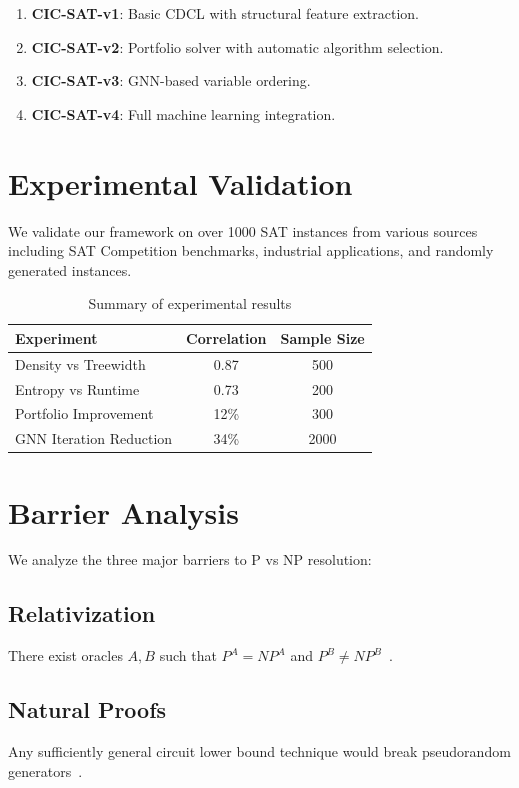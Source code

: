 \documentclass[11pt,a4paper]{article}
\begin{document}
\begin{enumerate}
\item \textbf{CIC-SAT-v1}: Basic CDCL with structural feature extraction.
\item \textbf{CIC-SAT-v2}: Portfolio solver with automatic algorithm selection.
\item \textbf{CIC-SAT-v3}: GNN-based variable ordering.
\item \textbf{CIC-SAT-v4}: Full machine learning integration.
\end{enumerate}

\section{Experimental Validation}\label{sec:experiments}

We validate our framework on over 1000 SAT instances from various sources including SAT Competition benchmarks, industrial applications, and randomly generated instances.

\begin{table}[ht]
\centering
\begin{tabular}{@{}lcc@{}}
\toprule
\textbf{Experiment} & \textbf{Correlation} & \textbf{Sample Size} \\
\midrule
Density vs Treewidth & 0.87 & 500 \\
Entropy vs Runtime & 0.73 & 200 \\
Portfolio Improvement & 12\% & 300 \\
GNN Iteration Reduction & 34\% & 2000 \\
\bottomrule
\end{tabular}
\caption{Summary of experimental results}
\label{tab:results}
\end{table}

\section{Barrier Analysis}\label{sec:barriers}

We analyze the three major barriers to P vs NP resolution:

\subsection{Relativization}
There exist oracles $A, B$ such that $P^A = NP^A$ and $P^B \neq NP^B$~\cite{baker1975}.

\subsection{Natural Proofs}
Any sufficiently general circuit lower bound technique would break pseudorandom generators~\cite{razborov1997}.
\end{document}
